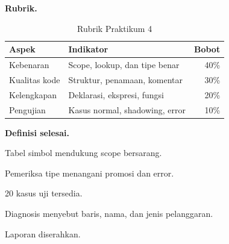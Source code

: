 \textbf{Rubrik.}
\begin{table}[H]
\centering
\caption{Rubrik Praktikum 4}
\label{tab:ch15-rubrik}
\begin{tabularx}{\textwidth}{@{}lXr@{}}
\toprule
\textbf{Aspek} & \textbf{Indikator} & \textbf{Bobot} \\
\midrule
Kebenaran & Scope, lookup, dan tipe benar & 40\% \\
Kualitas kode & Struktur, penamaan, komentar & 30\% \\
Kelengkapan & Deklarasi, ekspresi, fungsi & 20\% \\
Pengujian & Kasus normal, shadowing, error & 10\% \\
\bottomrule
\end{tabularx}
\end{table}

\textbf{Definisi selesai.}
\begin{checklist}
  \item Tabel simbol mendukung scope bersarang.
  \item Pemeriksa tipe menangani promosi dan error.
  \item 20 kasus uji tersedia.
  \item Diagnosis menyebut baris, nama, dan jenis pelanggaran.
  \item Laporan diserahkan.
\end{checklist}

